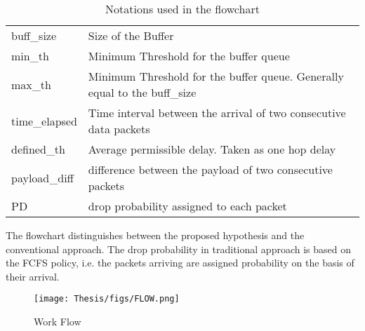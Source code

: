 \begin{table}[h!]
\begin{center}
\caption{Notations used in the flowchart}
\begin{tabular}{p{2.0cm} p{10.0cm} }
\hline
buff\_size & Size  of  the  Buffer\\ 
min\_th &  Minimum  Threshold  for  the  buffer  queue \\
max\_th & Minimum  Threshold  for  the  buffer  queue.  Generally  equal  to  the  buff\_size \\
time\_elapsed & Time  interval  between  the  arrival  of  two  consecutive  data  packets \\
defined\_th &  Average  permissible  delay.  Taken  as  one  hop  delay \\ payload\_diff &  difference  between  the  payload  of  two  consecutive  packets \\
PD & drop  probability  assigned  to  each  packet \\
\hline
\end{tabular}
\end{center}
\end{table}
The flowchart distinguishes between the proposed hypothesis and the conventional approach. The drop probability in traditional approach is based on the FCFS policy, i.e. the packets arriving are assigned probability on the basis of their arrival.\
\begin{figure}
    \centering
    \texttt{[image: Thesis/figs/FLOW.png]}
    \caption{Work Flow}
    \label{fig:my_label}
\end{figure}

